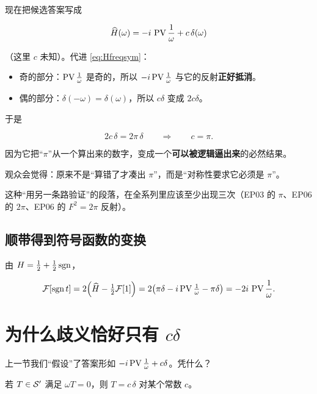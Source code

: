 现在把候选答案写成

\begin{equation}
\widehat{H}(\omega)=-i\,\operatorname{PV}\frac{1}{\omega}+c\,\delta(\omega)
\end{equation}

（这里 $c$ 未知）。代进 \eqref{eq:Hfreqsym}：

\begin{itemize}[leftmargin=1.6em,itemsep=0.3em]
\item 奇的部分：$\operatorname{PV}\frac{1}{\omega}$ 是奇的，所以 $-i\operatorname{PV}\frac1\omega$ 与它的反射\textbf{正好抵消}。
\item 偶的部分：$\delta(-\omega)=\delta(\omega)$，所以 $c\delta$ 变成 $2c\delta$。
\end{itemize}

于是

\begin{equation}
2c\,\delta=2\pi\,\delta
\qquad\Longrightarrow\qquad
c=\pi .
\end{equation}

\begin{ideabox}[这一步为什么值得单独讲]
因为它把“$\pi$”从一个算出来的数字，变成一个\textbf{可以被逻辑逼出来}的必然结果。

观众会觉得：原来不是“算错了才凑出 $\pi$”，而是“对称性要求它必须是 $\pi$”。

这种“用另一条路验证”的段落，在全系列里应该至少出现三次（EP03 的 $\pi$、EP06 的 $2\pi$、EP06 的 $F^2=2\pi$ 反射）。
\end{ideabox}

\subsection{顺带得到符号函数的变换}

由 $H=\frac12+\frac12\operatorname{sgn}$，

\begin{equation}
\mathcal{F}[\operatorname{sgn} t]=2\Big(\widehat{H}-\tfrac12\mathcal{F}[1]\Big)=2\big(\pi\delta-i\operatorname{PV}\tfrac1\omega-\pi\delta\big)
=-2i\,\operatorname{PV}\frac{1}{\omega} .\label{eq:sgn}
\end{equation}

\section{为什么歧义恰好只有 $c\delta$}

上一节我们“假设”了答案形如 $-i\operatorname{PV}\frac1\omega+c\delta$。凭什么？

\begin{prop}\label{prop:ambiguity}
若 $T\in\mathcal{S}'$ 满足 $\omega T=0$，则 $T=c\,\delta$ 对某个常数 $c$。
\end{prop}

